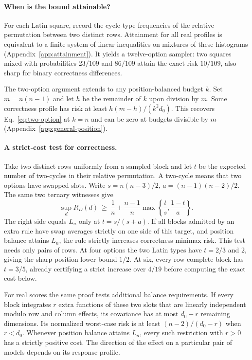 \paragraph{When is the bound attainable?}
For each Latin square, record the cycle-type frequencies of the relative permutation between two distinct rows. Attainment for all real profiles is equivalent to a finite system of linear inequalities on mixtures of these histograms (Appendix~\ref{app:attainment}). It yields a twelve-option sampler: two squares mixed with probabilities $23/109$ and $86/109$ attain the exact risk $10/109$, also sharp for binary correctness differences.

The two-option argument extends to any position-balanced budget $k$.
Set $m=n(n-1)$ and let $h$ be the remainder of $k$ upon division by
$m$. Some correctness profile has risk at least
$h(m-h)/(k^2 d_0)$. This recovers Eq.~\eqref{eq:two-option} at $k=n$
and can be zero at budgets divisible by $m$
(Appendix~\ref{app:general-position}).

\paragraph{A strict-cost test for correctness.}
Take two distinct rows uniformly from a sampled block and let $t$ be the
expected number of two-cycles in their relative permutation. A two-cycle
means that two options have swapped slots. Write $s=n(n-3)/2$,
$a=(n-1)(n-2)/2$. The same two ternary witnesses give
\begin{equation}
 \sup_d R_D(d)\ \ge\ \frac1n+\frac{n-1}{n}
       \max\!\left\{\frac{t}{s},\frac{1-t}{a}\right\}.
 \label{eq:swaps}
\end{equation}
The right side equals $L_n$ only at $t=s/(s+a)$. If all blocks
admitted by an extra rule have swap averages strictly on one side
of this target, and position balance attains $L_n$, the rule
strictly increases correctness minimax risk. This test needs only
pairs of rows. At four options the two Latin types have $t=2/3$
and $2$, giving the sharp position lower bound $1/2$. At six,
every row-complete block has $t=3/5$, already certifying a strict
increase over $4/19$ before computing the exact cost below.

For real scores the same proof tests additional balance requirements.
If every block integrates $r$ extra functions of these two slots that
are linearly independent modulo row and column effects, its covariance
has at most $d_0-r$ remaining dimensions. Its normalized worst-case
risk is at least $(n-2)/(d_0-r)$ when $r<d_0$.
Whenever position balance attains $L_n$, every such restriction with
$r>0$ has a strictly positive cost. The direction of the effect on a
particular pair of models depends on its response profile.

